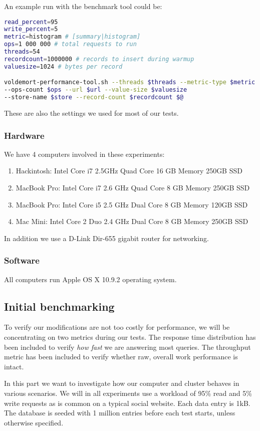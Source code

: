 An example run with the benchmark tool could be:
\begin{lstlisting}[language=bash]
read_percent=95
write_percent=5
metric=histogram # [summary|histogram]
ops=1 000 000 # total requests to run
threads=54
recordcount=1000000 # records to insert during warmup
valuesize=1024 # bytes per record

voldemort-performance-tool.sh --threads $threads --metric-type $metric 
--ops-count $ops --url $url --value-size $valuesize 
--store-name $store --record-count $recordcount $@
\end{lstlisting}

These are also the settings we used for most of our tests.

\subsubsection{Hardware}
We have 4 computers involved in these experiments:

\begin{enumerate}
	\item Hackintosh: Intel Core i7 2.5GHz Quad Core  16 GB Memory 250GB SSD
	\item MacBook Pro: Intel Core i7 2.6 GHz Quad Core 8 GB Memory 250GB SSD
	\item MacBook Pro: Intel Core i5 2.5 GHz Dual Core 8 GB Memory 120GB SSD
	\item Mac Mini: Intel Core 2 Duo 2.4 GHz Dual Core 8 GB Memory 250GB SSD
\end{enumerate}

In addition we use a D-Link Dir-655 gigabit router for networking.

\subsubsection{Software}
All computers run Apple OS X 10.9.2 operating system. 

\subsection{Initial benchmarking}
To verify our modifications are not too costly for performance, we will be concentrating on two metrics during our tests. The response time distribution has been included to verify \emph{how fast} we are answering most queries. The throughput metric has been included to verify whether raw, overall work performance is intact.

In this part we want to investigate how our computer and cluster behaves in various scenarios. We will in all experiments use a workload of 95\% read and 5\% write requests as is common on a typical social website. Each data entry is 1kB. The database is seeded with 1 million entries before each test starts, unless otherwise specified. 


